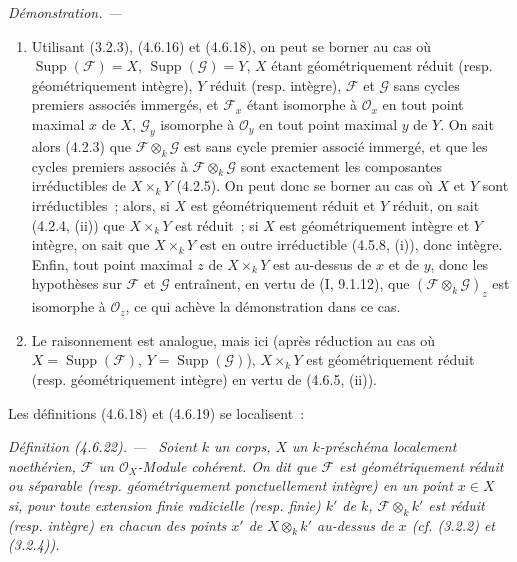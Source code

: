 \documentclass[10pt,oneside]{book}
\newenvironment{definition}[1][]{%
  \par\medskip\noindent\itshape Définition (#1). ---\ }{\par}
\newenvironment{proof}{%
  \par\medskip\noindent\textit{Démonstration. ---\ }}{\par}
\begin{document}
\begin{proof}
\begin{enumerate}
\item[(i)] Utilisant (3.2.3), (4.6.16) et (4.6.18), on peut se borner au cas où
$\operatorname{Supp}(\mathscr F)=X$, $\operatorname{Supp}(\mathscr G)=Y$, $X$
étant géométriquement réduit (resp. géométriquement intègre), $Y$ réduit
(resp. intègre), $\mathscr F$ et $\mathscr G$ sans cycles premiers associés
immergés, et $\mathscr F_x$ étant isomorphe à $\mathcal O_x$ en tout point
maximal $x$ de $X$, $\mathscr G_y$ isomorphe à $\mathcal O_y$ en tout point
maximal $y$ de $Y$. On sait alors (4.2.3) que
$\mathscr F\otimes_k\mathscr G$ est sans cycle premier associé immergé, et que
les cycles premiers associés à $\mathscr F\otimes_k\mathscr G$ sont exactement
les composantes irréductibles de $X\times_k Y$ (4.2.5). On peut donc se borner
au cas où $X$ et $Y$ sont irréductibles~; alors, si $X$ est géométriquement
réduit et $Y$ réduit, on sait (4.2.4, (ii)) que $X\times_k Y$ est réduit~; si
$X$ est géométriquement intègre et $Y$ intègre, on sait que $X\times_k Y$ est
en outre irréductible (4.5.8, (i)), donc intègre. Enfin, tout point maximal $z$
de $X\times_k Y$ est au-dessus de $x$ et de $y$, donc les hypothèses sur
$\mathscr F$ et $\mathscr G$ entraînent, en vertu de (I, 9.1.12), que
$(\mathscr F\otimes_k\mathscr G)_z$ est isomorphe à $\mathcal O_z$, ce qui
achève la démonstration dans ce cas.

\item[(ii)] Le raisonnement est analogue, mais ici (après réduction au cas où
$X=\operatorname{Supp}(\mathscr F)$, $Y=\operatorname{Supp}(\mathscr G)$),
$X\times_k Y$ est géométriquement réduit (resp. géométriquement intègre) en
vertu de (4.6.5, (ii)).
\end{enumerate}
\end{proof}

Les définitions (4.6.18) et (4.6.19) se localisent~:

\begin{definition}[4.6.22]
\label{IV.2.4.6.22-fr}
Soient $k$ un corps, $X$ un $k$-préschéma localement noethérien, $\mathscr F$
un $\mathcal O_X$-Module cohérent. On dit que $\mathscr F$ est
\emph{géométriquement réduit} ou \emph{séparable} (resp. géométriquement
ponctuellement intègre) en un point $x\in X$ si, pour toute extension finie
radicielle (resp. finie) $k'$ de $k$, $\mathscr F\otimes_k k'$ est réduit
(resp. intègre) en chacun des points $x'$ de $X\otimes_k k'$ au-dessus de $x$
(cf. (3.2.2) et (3.2.4)).
\end{definition}
\end{document}
